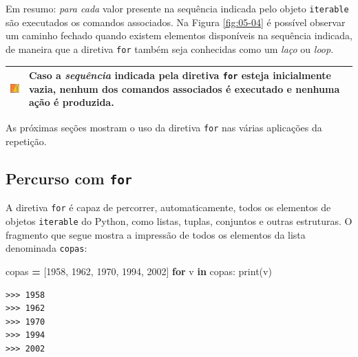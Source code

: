 \documentclass[
]{book}
\newenvironment{Shaded}{\begin{snugshade}}{\end{snugshade}}
\newcommand{\BuiltInTok}[1]{#1}
\newcommand{\ControlFlowTok}[1]{\textcolor[rgb]{0.13,0.29,0.53}{\textbf{#1}}}
\newcommand{\DecValTok}[1]{\textcolor[rgb]{0.00,0.00,0.81}{#1}}
\newcommand{\KeywordTok}[1]{\textcolor[rgb]{0.13,0.29,0.53}{\textbf{#1}}}
\newcommand{\NormalTok}[1]{#1}
\newcommand{\OperatorTok}[1]{\textcolor[rgb]{0.81,0.36,0.00}{\textbf{#1}}}
\begin{document}
Em resumo: \emph{para cada} valor presente na sequência indicada pelo objeto \texttt{iterable} são executados os comandos associados. Na Figura \ref{fig:05-04} é possível observar um caminho fechado quando existem elementos disponíveis na sequência indicada, de maneira que a diretiva \texttt{for} também seja conhecidas como um \emph{laço} ou \emph{loop}.

\begin{longtable}[]{@{}
  >{\centering\arraybackslash}p{}
  >{\raggedright\arraybackslash}p{}@{}}
\toprule
\includegraphics{images/warn.png} & Caso a \emph{sequência} indicada pela diretiva \texttt{for} esteja inicialmente vazia, nenhum dos comandos associados é executado e nenhuma ação é produzida. \\
\midrule
\endhead
\bottomrule
\end{longtable}

As próximas seções mostram o uso da diretiva \texttt{for} nas várias aplicações da repetição.

\hypertarget{repet-for-percu}{%
\subsection{\texorpdfstring{Percurso com \texttt{for}}{Percurso com for}}\label{repet-for-percu}}

A diretiva \texttt{for} é capaz de percorrer, automaticamente, todos os elementos de objetos \texttt{iterable} do Python, como listas, tuplas, conjuntos e outras estruturas. O fragmento que segue mostra a impressão de todos os elementos da lista denominada \texttt{copas}:

\begin{Shaded}
\begin{Highlighting}[]
\NormalTok{copas }\OperatorTok{=}\NormalTok{ [}\DecValTok{1958}\NormalTok{, }\DecValTok{1962}\NormalTok{, }\DecValTok{1970}\NormalTok{, }\DecValTok{1994}\NormalTok{, }\DecValTok{2002}\NormalTok{]}
\ControlFlowTok{for}\NormalTok{ v }\KeywordTok{in}\NormalTok{ copas:}
    \BuiltInTok{print}\NormalTok{(v)}
\end{Highlighting}
\end{Shaded}

\begin{verbatim}
>>> 1958
>>> 1962
>>> 1970
>>> 1994
>>> 2002
\end{verbatim}
\end{document}
